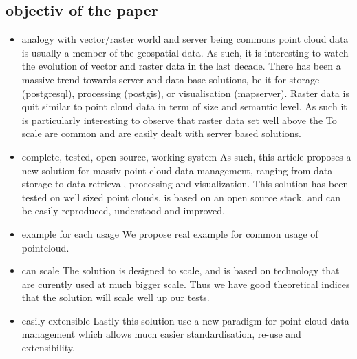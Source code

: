 	\subsection{objectiv of the paper}
		\begin{itemize}
			\item analogy with vector/raster world and server being commons
				point cloud data is usually a member of the geospatial data. 
				As such, it is interesting to watch the evolution of vector and raster data in the last decade.
				There has been a massive trend towards server and data base solutions, be it for storage (postgresql), processing (postgis), or visualisation (mapserver).
				Raster data is quit similar to point cloud data in term of size and semantic level. As such it is particularly interesting to observe that raster data set well above the To scale are common and are easily dealt with server based solutions.
			\item complete, tested, open source, working system
				As such, this article proposes a new solution for massiv point cloud data management, ranging from data storage to data retrieval, processing and visualization.
				This solution has been tested on well sized point clouds, is based on an open source stack, and can be easily reproduced, understood and improved. 
			\item example for each usage
				We propose real example for common usage of pointcloud.
			\item can scale
				The solution is designed to scale, and is based on technology that are curently used at much bigger scale. Thus we have good theoretical indices that the solution will scale well up our tests.
			\item easily extensible
				Lastly this solution use a new paradigm for point cloud data management which allows much easier standardisation, re-use and extensibility.
		\end{itemize}  